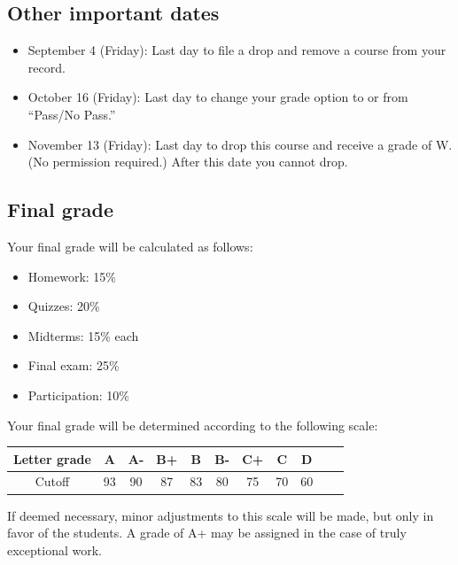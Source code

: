 \documentclass[12pt]{amsart}
\begin{document}
\subsection*{Other important dates} \begin{itemize}
\item September 4 (Friday):  Last day to file a drop and remove a course from your record.
\item October 16 (Friday):  Last day to change your grade option to or from ``Pass/No Pass.''
\item November 13 (Friday):  Last day to drop this course and receive a grade of W. \\(No permission required.) After this date you cannot drop.
\end{itemize} 

\subsection*{Final grade} Your final grade will be calculated as follows:

\begin{itemize}

	\item Homework: 15\%
	\item Quizzes: 20\%
	\item Midterms: 15\% each
	\item Final exam: 25\%
	\item Participation: 10\%
	\end{itemize}

\noindent
Your final grade will be determined according to the following scale:

\begin{center}
\hspace{2em}
\begin{minipage}{0.75\textwidth}
	\begin{tabular}{|c||c|c|c|c|c|c|c|c|c|c|}
	\hline
	Letter grade & A & A- & B+ & B & B- & C+ & C & D \\
	\hline
	Cutoff & 93 & 90 & 87 & 83 & 80 & 75 & 70 & 60 \\
	\hline
\end{tabular}
\end{minipage}
\end{center}

\noindent
If deemed necessary, minor adjustments to this scale will be made, but only in favor of the students. A grade of A+ may be assigned in the case of truly exceptional work.
\end{document}
